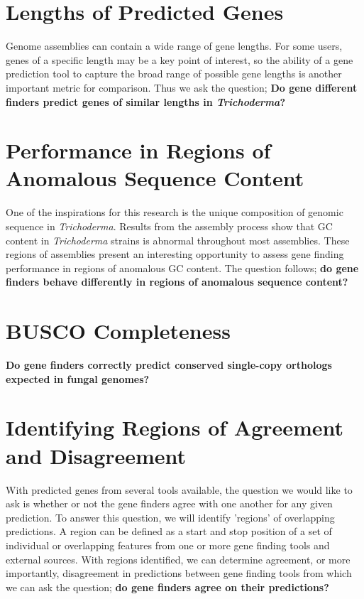 \section{Lengths of Predicted Genes}

Genome assemblies can contain a wide range of gene lengths. For some
users, genes of a specific length may be a key point of interest, so
the ability of a gene prediction tool to capture the broad range of
possible gene lengths is another important metric for comparison. Thus
we ask the question; \textbf{Do gene different finders predict genes
  of similar lengths in \textit{Trichoderma}?}

\section{Performance in Regions of Anomalous Sequence Content}

One of the inspirations for this research is the unique composition of
genomic sequence in \textit{Trichoderma}. Results from the assembly
process show that GC content in \textit{Trichoderma} strains is
abnormal throughout most assemblies. These regions of assemblies
present an interesting opportunity to assess gene finding performance
in regions of anomalous GC content. The question follows; \textbf{do
  gene finders behave differently in regions of anomalous sequence
  content?}

\section{BUSCO Completeness}

\textbf{Do gene finders correctly predict conserved single-copy
  orthologs expected in fungal genomes?}


\section{Identifying Regions of Agreement and Disagreement}

With predicted genes from several tools available, the question we
would like to ask is whether or not the gene finders agree with one
another for any given prediction. To answer this question, we will
identify 'regions' of overlapping predictions. A region can be defined
as a start and stop position of a set of individual or overlapping
features from one or more gene finding tools and external
sources. With regions identified, we can determine agreement, or more
importantly, disagreement in predictions between gene finding tools
from which we can ask the question; \textbf{do gene finders agree on
  their predictions?}
